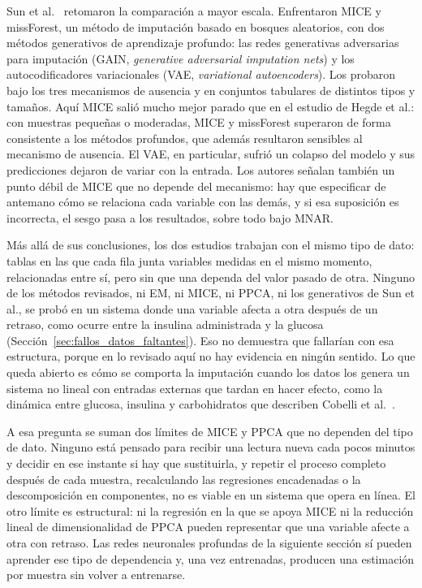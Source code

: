 \documentclass{report}
\begin{document}
Sun et al.~\cite{sun2023deep} retomaron la comparación a mayor escala. Enfrentaron MICE y missForest, un método de imputación basado en bosques aleatorios, con dos métodos generativos de aprendizaje profundo: las redes generativas adversarias para imputación (GAIN, \textit{generative adversarial imputation nets}) y los autocodificadores variacionales (VAE, \textit{variational autoencoders}). Los probaron bajo los tres mecanismos de ausencia y en conjuntos tabulares de distintos tipos y tamaños. Aquí MICE salió mucho mejor parado que en el estudio de Hegde et al.: con muestras pequeñas o moderadas, MICE y missForest superaron de forma consistente a los métodos profundos, que además resultaron sensibles al mecanismo de ausencia. El VAE, en particular, sufrió un colapso del modelo y sus predicciones dejaron de variar con la entrada. Los autores señalan también un punto débil de MICE que no depende del mecanismo: hay que especificar de antemano cómo se relaciona cada variable con las demás, y si esa suposición es incorrecta, el sesgo pasa a los resultados, sobre todo bajo MNAR.

Más allá de sus conclusiones, los dos estudios trabajan con el mismo tipo de dato: tablas en las que cada fila junta variables medidas en el mismo momento, relacionadas entre sí, pero sin que una dependa del valor pasado de otra. Ninguno de los métodos revisados, ni EM, ni MICE, ni PPCA, ni los generativos de Sun et al., se probó en un sistema donde una variable afecta a otra después de un retraso, como ocurre entre la insulina administrada y la glucosa (Sección~\ref{sec:fallos_datos_faltantes}). Eso no demuestra que fallarían con esa estructura, porque en lo revisado aquí no hay evidencia en ningún sentido. Lo que queda abierto es cómo se comporta la imputación cuando los datos los genera un sistema no lineal con entradas externas que tardan en hacer efecto, como la dinámica entre glucosa, insulina y carbohidratos que describen Cobelli et al.~\cite{cobelli2009diabetes}.

A esa pregunta se suman dos límites de MICE y PPCA que no dependen del tipo de dato. Ninguno está pensado para recibir una lectura nueva cada pocos minutos y decidir en ese instante si hay que sustituirla, y repetir el proceso completo después de cada muestra, recalculando las regresiones encadenadas o la descomposición en componentes, no es viable en un sistema que opera en línea. El otro límite es estructural: ni la regresión en la que se apoya MICE ni la reducción lineal de dimensionalidad de PPCA pueden representar que una variable afecte a otra con retraso. Las redes neuronales profundas de la siguiente sección sí pueden aprender ese tipo de dependencia y, una vez entrenadas, producen una estimación por muestra sin volver a entrenarse.
\end{document}
